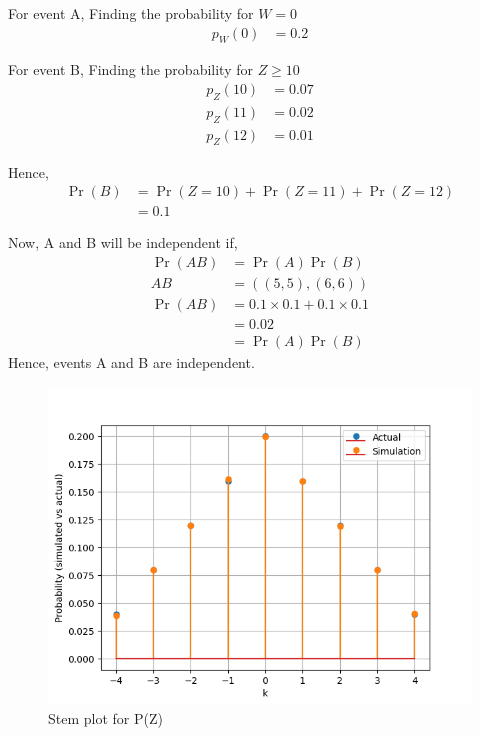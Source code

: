\documentclass[]{article}
\begin{document}
For event A,
Finding the probability for $W = 0$
\begin{align}
	p_W(0) &= 0.2 
\end{align}

For event B,
Finding the probability for $Z\geq 10$
\begin{align}
p_Z(10) &= 0.07\\
p_Z(11) &= 0.02\\
p_Z(12) &= 0.01
\end{align}

Hence,
\begin{align}
\Pr(B) &= \Pr(Z=10) + \Pr(Z=11) + \Pr(Z=12)\\
&= 0.1
\end{align}

Now, A and B will be independent if,
\begin{align}
\Pr(AB) &= \Pr(A)\Pr(B)\\
AB &= ((5,5), (6,6)) \\
\Pr(AB) &= 0.1 \times 0.1 + 0.1 \times 0.1\\
&= 0.02\\
&= \Pr(A)\Pr(B)
\end{align}
Hence, events A and B are independent.
\begin{figure}
\includegraphics[width=\columnwidth]{./figs/fig.png}
\caption{Stem plot for P(Z)}
\label{fig:exemplar/12/13/3/1/}
\end{figure}
\end{document}
